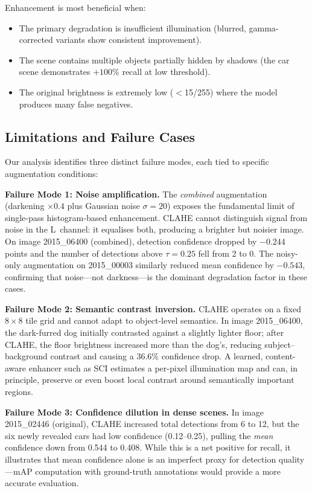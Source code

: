 \documentclass[conference]{IEEEtran}
\begin{document}
Enhancement is most beneficial when:
\begin{itemize}
  \item The primary degradation is insufficient illumination (blurred,
  gamma-corrected variants show consistent improvement).
  \item The scene contains multiple objects partially hidden by shadows
  (the car scene demonstrates $+100\%$ recall at low threshold).
  \item The original brightness is extremely low ($<$15/255) where the
  model produces many false negatives.
\end{itemize}

\subsection{Limitations and Failure Cases}

Our analysis identifies three distinct failure modes, each tied to
specific augmentation conditions:

\textbf{Failure Mode 1: Noise amplification.}
The \emph{combined} augmentation (darkening $\times 0.4$ plus Gaussian
noise $\sigma=20$) exposes the fundamental limit of single-pass
histogram-based enhancement.  CLAHE cannot distinguish signal from
noise in the L~channel: it equalises both, producing a brighter but
noisier image.  On image 2015\_06400 (combined), detection confidence
dropped by $-0.244$ points and the number of detections above
$\tau=0.25$ fell from 2 to 0.  The noisy-only augmentation on
2015\_00003 similarly reduced mean confidence by $-0.543$, confirming
that noise---not darkness---is the dominant degradation factor in
these cases.

\textbf{Failure Mode 2: Semantic contrast inversion.}
CLAHE operates on a fixed $8{\times}8$ tile grid and cannot adapt to
object-level semantics.  In image 2015\_06400, the dark-furred dog
initially contrasted against a slightly lighter floor; after CLAHE,
the floor brightness increased more than the dog's, reducing
subject--background contrast and causing a 36.6\% confidence drop.
A learned, content-aware enhancer such as SCI estimates a per-pixel
illumination map and can, in principle, preserve or even boost local
contrast around semantically important regions.

\textbf{Failure Mode 3: Confidence dilution in dense scenes.}
In image 2015\_02446 (original), CLAHE increased total detections
from 6 to 12, but the six newly revealed cars had low confidence
(0.12--0.25), pulling the \emph{mean} confidence down from 0.544 to
0.408.  While this is a net positive for recall, it illustrates
that mean confidence alone is an imperfect proxy for detection
quality---mAP computation with ground-truth annotations would
provide a more accurate evaluation.
\end{document}
